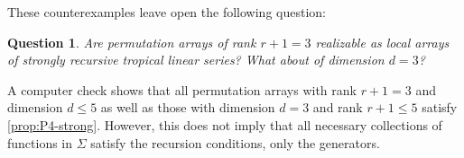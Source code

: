 \documentclass{amsart}
\newtheorem{question}[theorem]{Question}
\begin{document}
	These counterexamples leave open the following question:
	
	\begin{question}
		Are permutation arrays of rank $r+1=3$ realizable as local arrays of strongly recursive tropical linear series? What about of dimension $d=3$?
	\end{question}
	
	A computer check shows that all permutation arrays with rank $r+1 = 3$ and dimension $d \leq 5$ as well as those with dimension $d = 3$ and rank $r+1 \leq 5$ satisfy \ref{prop:P4-strong}. However, this does not imply that all necessary collections of functions in $\Sigma$ satisfy the recursion conditions, only the generators.
	
	
	
\end{document}
